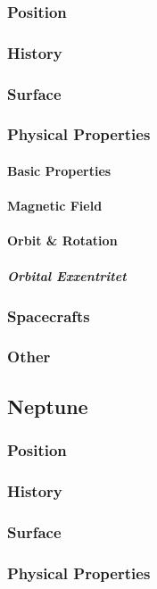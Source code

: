 \subsubsection{Position}
\subsubsection{History}
\subsubsection{Surface}
\subsubsection{Physical Properties}
\paragraph{Basic Properties}
\paragraph{Magnetic Field}
\paragraph{Orbit \& Rotation}
\subparagraph{Orbital Exxentritet}
\subsubsection{Spacecrafts}
\subsubsection{Other}
\subsection{Neptune}
\subsubsection{Position}
\subsubsection{History}
\subsubsection{Surface}
\subsubsection{Physical Properties}
